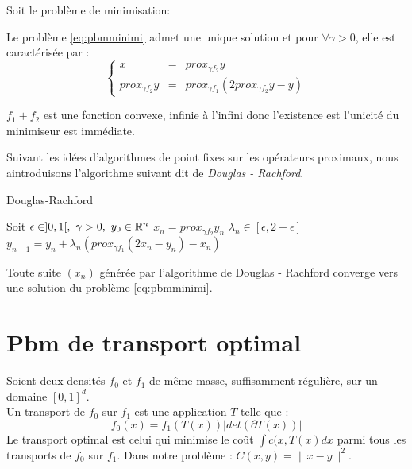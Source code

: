 \documentclass[a4paper,12pt]{article}
\begin{document}
 
Soit le problème de minimisation: \\


\begin{propriete}
Le problème \ref{eq:pbmminimi} admet une unique solution et pour $\forall \gamma >0$, elle est caractérisée par :
$$
\left\{
\begin{array}{rcl}
x &= & prox_{\gamma f_2} y \\
prox_{\gamma f_2}y &= & prox_{\gamma f_1}(2prox_{\gamma f_2}y -y)
\end{array}
\right.
$$
\end{propriete}

\begin{preuve}
$f_1+f_2$ est une fonction convexe, infinie à l'infini donc l'existence est l'unicité du minimiseur est immédiate.
\end{preuve}

Suivant les idées d'algorithmes de point fixes sur les opérateurs proximaux, nous aintroduisons l'algorithme suivant dit de \emph{Douglas - Rachford}.
\begin{algorithm}
\caption{Douglas-Rachford}
\begin{algorithmic}
\STATE Soit $\epsilon \in ]0,1[,\ \gamma >0,\ y_0\in \RR^n$
\STATE $x_n = prox_{\gamma f_2} y_n$
\STATE $\lambda_n \in [\epsilon,2-\epsilon]$
\STATE $y_{n+1} = y_n + \lambda_n(prox_{\gamma f_1} (2x_n-y_n)-x_n)$
\ENDFOR
\end{algorithmic}
\end{algorithm}

\begin{propriete}
Toute suite $(x_n)$ générée par l'algorithme de Douglas - Rachford converge vers une solution du problème \ref{eq:pbmminimi}.
\end{propriete}








\newpage
\section{Pbm de transport optimal}
Soient deux densités $f_0$ et $f_1$ de même masse, suffisamment régulière, sur un domaine $[0,1]^d$.\\
Un transport de $f_0$ sur $f_1$ est une application $T$ telle que :
$$
f_0(x)=f_1(T(x))|det(\partial T(x))|
$$
Le transport optimal est celui qui minimise le coût $\int c(x,T(x)dx$ parmi tous les transports de $f_0$ sur $f_1$. Dans notre problème : $C(x,y) =\|x-y\|^2$. 
\end{document}
